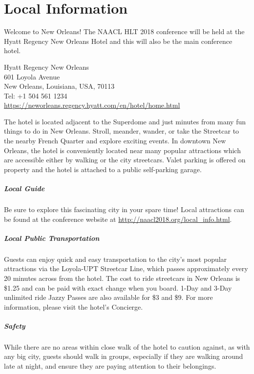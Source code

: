 \chapter{Local Information}

Welcome to New Orleans!  The NAACL HLT 2018 conference will be held at the Hyatt Regency New Orleans Hotel and this will also be the main conference hotel.

Hyatt Regency New Orleans \\
601 Loyola Avenue \\
New Orleans, Louisiana, USA, 70113 \\
Tel: +1 504 561 1234\\
\url{https://neworleans.regency.hyatt.com/en/hotel/home.html}

The hotel is located adjacent to the Superdome and just minutes from many fun things to do in New Orleans. Stroll, meander, wander, or take the Streetcar to the nearby French Quarter and explore exciting events.  In downtown New Orleans, the hotel is conveniently located near many popular attractions which are accessible either by walking or the city streetcars. Valet parking is offered on property and the hotel is attached to a public self-parking garage. 

\paragraph{Local Guide}

Be sure to explore this fascinating city in your spare time!  Local attractions can be found at the conference website at \url{http://naacl2018.org/local_info.html}.


\paragraph{Local Public Transportation}

Guests can enjoy quick and easy transportation to the city’s most popular attractions via the Loyola-UPT Streetcar Line, which passes approximately every 20 minutes across from the hotel. The cost to ride streetcars in New Orleans is \$1.25 and can be paid with exact change when you board. 1-Day and 3-Day unlimited ride Jazzy Passes are also available for \$3 and \$9. For more information, please visit the hotel’s Concierge.

\paragraph{Safety}

While there are no areas within close walk of the hotel to caution against, as with any big city, guests should walk in groups, especially if they are walking around late at night, and ensure they are paying attention
to their belongings.




